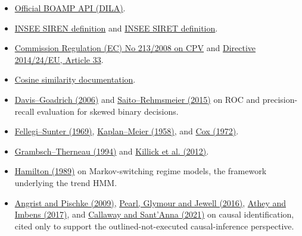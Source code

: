 \documentclass[11pt,a4paper]{article}
\begin{document}
\begin{itemize}
\item \href{https://www.data.gouv.fr/dataservices/api-bulletin-officiel-des-annonces-des-marches-publics-boamp}{Official BOAMP API (DILA)}.
\item \href{https://www.insee.fr/fr/metadonnees/definition/c2047}{INSEE SIREN definition} and
\href{https://www.insee.fr/fr/metadonnees/definition/c1841}{INSEE SIRET definition}.
\item \href{https://eur-lex.europa.eu/eli/reg/2008/213/oj}{Commission Regulation (EC) No 213/2008 on CPV} and
\href{https://eur-lex.europa.eu/eli/dir/2014/24/oj}{Directive 2014/24/EU, Article 33}.
\item \href{https://scikit-learn.org/stable/modules/metrics.html\#cosine-similarity}{Cosine similarity documentation}.
\item \href{https://doi.org/10.1145/1143844.1143874}{Davis--Goadrich (2006)} and
\href{https://doi.org/10.1371/journal.pone.0118432}{Saito--Rehmsmeier (2015)} on ROC and precision-recall evaluation for skewed binary decisions.
\item \href{https://doi.org/10.1080/01621459.1969.10501049}{Fellegi--Sunter (1969)},
\href{https://doi.org/10.1080/01621459.1958.10501452}{Kaplan--Meier (1958)}, and
\href{https://doi.org/10.1111/j.2517-6161.1972.tb00899.x}{Cox (1972)}.
\item \href{https://doi.org/10.1093/biomet/81.3.515}{Grambsch--Therneau (1994)} and
\href{https://doi.org/10.1080/01621459.2012.737745}{Killick et al. (2012)}.
\item \href{https://doi.org/10.2307/1912559}{Hamilton (1989)} on Markov-switching
regime models, the framework underlying the trend HMM.
\item \href{https://www.jstor.org/stable/j.ctvcm4j72}{Angrist and Pischke
(2009)}, \href{https://www.wiley.com/en-us/Causal+Inference+in+Statistics\%3A+A+Primer-p-9781119186847}{Pearl,
Glymour and Jewell (2016)}, \href{https://doi.org/10.1257/jep.31.2.3}{Athey
and Imbens (2017)}, and
\href{https://doi.org/10.1016/j.jeconom.2020.12.001}{Callaway and Sant'Anna
(2021)} on causal identification, cited only to support the outlined-not-executed
causal-inference perspective.
\end{itemize}
\end{document}
